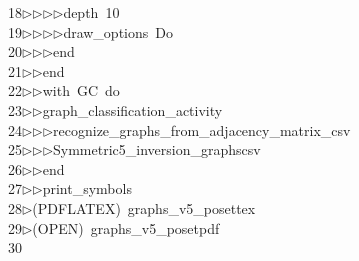 \begin{tabbing}
18\>$\triangleright$\>$\triangleright$\>$\triangleright$\>$\triangleright$\>depth\ 10\ \\[0pt]
19\>$\triangleright$\>$\triangleright$\>$\triangleright$\>$\triangleright$\>draw\_options\ Do\ \\[0pt]
20\>$\triangleright$\>$\triangleright$\>$\triangleright$\>end\ \\[0pt]
21\>$\triangleright$\>$\triangleright$\>end\ \\[0pt]
22\>$\triangleright$\>$\triangleright$\>with\ GC\ do\ \\[0pt]
23\>$\triangleright$\>$\triangleright$\>graph\_classification\_activity\ \\[0pt]
24\>$\triangleright$\>$\triangleright$\>$\triangleright$\>recognize\_graphs\_from\_adjacency\_matrix\_csv\ \\[0pt]
25\>$\triangleright$\>$\triangleright$\>$\triangleright$\>Symmetric5\_inversion\_graphscsv\ \\[0pt]
26\>$\triangleright$\>$\triangleright$\>end\ \\[0pt]
27\>$\triangleright$\>$\triangleright$\>print\_symbols\\[0pt]
28\>$\triangleright$\>(PDFLATEX)\ graphs\_v5\_posettex\\[0pt]
29\>$\triangleright$\>(OPEN)\ graphs\_v5\_posetpdf\\[0pt]
30\>\end{tabbing}
